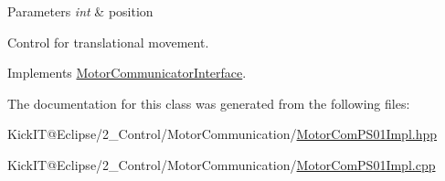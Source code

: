 \begin{DoxyParams}{Parameters}
{\em int} & position\\
\hline
\end{DoxyParams}
Control for translational movement. 

Implements \hyperlink{class_motor_communicator_interface_ac4621f673547a5c0b63207348cef69d3}{Motor\+Communicator\+Interface}.



The documentation for this class was generated from the following files\+:\begin{DoxyCompactItemize}
\item 
Kick\+I\+T@\+Eclipse/2\+\_\+\+Control/\+Motor\+Communication/\hyperlink{_motor_com_p_s01_impl_8hpp}{Motor\+Com\+P\+S01\+Impl.\+hpp}\item 
Kick\+I\+T@\+Eclipse/2\+\_\+\+Control/\+Motor\+Communication/\hyperlink{_motor_com_p_s01_impl_8cpp}{Motor\+Com\+P\+S01\+Impl.\+cpp}\end{DoxyCompactItemize}
